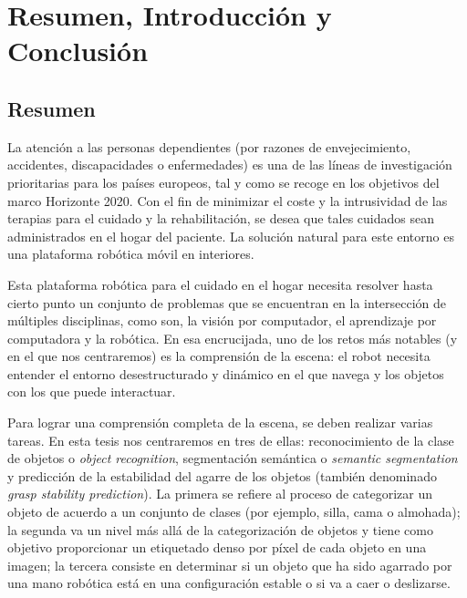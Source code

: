\chapter{Resumen, Introducción y Conclusión}
\label{cha:conclusion_sp}

\section{Resumen}

La atención a las personas dependientes (por razones de envejecimiento, accidentes, discapacidades o enfermedades) es una de las líneas de investigación prioritarias para los países europeos, tal y como se recoge en los objetivos del marco Horizonte 2020. Con el fin de minimizar el coste y la intrusividad de las terapias para el cuidado y la rehabilitación, se desea que tales cuidados sean administrados en el hogar del paciente. La solución natural para este entorno es una plataforma robótica móvil en interiores.

Esta plataforma robótica para el cuidado en el hogar necesita resolver hasta cierto punto un conjunto de problemas que se encuentran en la intersección de múltiples disciplinas, como son, la visión por computador, el aprendizaje por computadora y la robótica. En esa encrucijada, uno de los retos más notables (y en el que nos centraremos) es la comprensión de la escena: el robot necesita entender el entorno desestructurado y dinámico en el que navega y los objetos con los que puede interactuar.

Para lograr una comprensión completa de la escena, se deben realizar varias tareas. En esta tesis nos centraremos en tres de ellas: reconocimiento de la clase de objetos o \emph{object recognition}, segmentación semántica o \emph{semantic segmentation} y predicción de la estabilidad del agarre de los objetos (también denominado \emph{grasp stability prediction}). La primera se refiere al proceso de categorizar un objeto de acuerdo a un conjunto de clases (por ejemplo, silla, cama o almohada); la segunda va un nivel más allá de la categorización de objetos y tiene como objetivo proporcionar un etiquetado denso por píxel de cada objeto en una imagen; la tercera consiste en determinar si un objeto que ha sido agarrado por una mano robótica está en una configuración estable o si va a caer o deslizarse.

